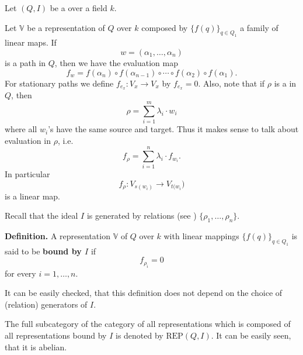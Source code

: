\documentclass[12pt]{article}
\begin{document}
Let $(Q,I)$ be a  over a field $k$.

Let $\mathbb{V}$ be a representation of $Q$ over $k$ composed by $\{f(q)\}_{q\in Q_1}$ a family of linear maps. If $$w=(\alpha_1,\ldots,\alpha_n)$$
is a path in $Q$, then we have the evaluation map
$$f_{w}=f(\alpha_n)\circ f(\alpha_{n-1})\circ\cdots\circ f(\alpha_2)\circ f(\alpha_1).$$
For stationary paths we define $f_{e_x}:V_x\to V_x$ by $f_{e_x}=0$. Also, note that if $\rho$ is a  in $Q$, then
$$\rho=\sum_{i=1}^m\lambda_i\cdot w_i$$
where all $w_i$'s have the same source and target. Thus it makes sense to talk about evaluation in $\rho$, i.e.
$$f_{\rho}=\sum_{i=1}^n\lambda_i\cdot f_{w_i}.$$
In particular
$$f_{\rho}:V_{s(w_i)}\to V_{t(w_i})$$
is a linear map.

Recall that the ideal $I$ is generated by relations (see ) $\{\rho_1,\ldots,\rho_n\}$.

\textbf{Definition.} A representation $\mathbb{V}$ of $Q$ over $k$ with linear mappings $\{f(q)\}_{q\in Q_1}$ is said to be \textbf{bound by $I$} if 
$$f_{\rho_i}=0$$
for every $i=1,\ldots,n$.

It can be easily checked, that this definition does not depend on the choice of (relation) generators of $I$.

The full subcategory of the category of all representations which is composed of all representations bound by $I$ is denoted by $\mathrm{REP}(Q,I)$. It can be easily seen, that it is abelian.
\end{document}
